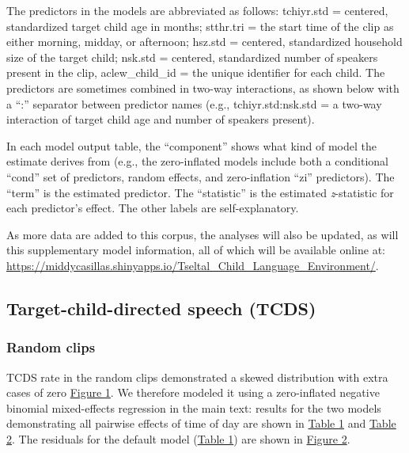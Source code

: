 \documentclass[floatsintext,man]{apa6}
\theoremstyle{definition}
\theoremstyle{definition}
\theoremstyle{definition}
\theoremstyle{remark}
\begin{document}
The predictors in the models are abbreviated as follows: tchiyr.std =
centered, standardized target child age in months; stthr.tri = the start
time of the clip as either morning, midday, or afternoon; hsz.std =
centered, standardized household size of the target child; nsk.std =
centered, standardized number of speakers present in the clip,
aclew\_child\_id = the unique identifier for each child. The predictors
are sometimes combined in two-way interactions, as shown below with a
\enquote{:} separator between predictor names (e.g., tchiyr.std:nsk.std
= a two-way interaction of target child age and number of speakers
present).

In each model output table, the \enquote{component} shows what kind of
model the estimate derives from (e.g., the zero-inflated models include
both a conditional \enquote{cond} set of predictors, random effects, and
zero-inflation \enquote{zi} predictors). The \enquote{term} is the
estimated predictor. The \enquote{statistic} is the estimated
\emph{z}-statistic for each predictor's effect. The other labels are
self-explanatory.

As more data are added to this corpus, the analyses will also be
updated, as will this supplementary model information, all of which will
be available online at:
\url{https://middycasillas.shinyapps.io/Tseltal_Child_Language_Environment/}.

\subsection{Target-child-directed speech (TCDS)}\label{models-tcds}

\subsubsection{Random clips}\label{models-tcds-random}

TCDS rate in the random clips demonstrated a skewed distribution with
extra cases of zero \protect\hyperlink{fig1}{Figure 1}. We therefore
modeled it using a zero-inflated negative binomial mixed-effects
regression in the main text: results for the two models demonstrating
all pairwise effects of time of day are shown in
\protect\hyperlink{tab1}{Table 1} and \protect\hyperlink{tab2}{Table 2}.
The residuals for the default model (\protect\hyperlink{tab1}{Table 1})
are shown in \protect\hyperlink{fig2}{Figure 2}.

\FloatBarrier
\end{document}
